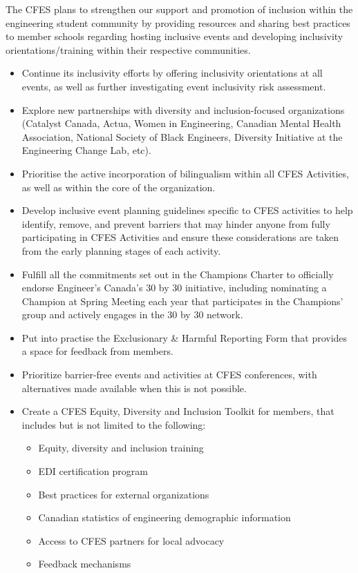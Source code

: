 
The CFES plans to strengthen our support and promotion of inclusion within the engineering student community by providing resources and sharing best practices to member schools regarding hosting inclusive events and developing inclusivity orientations/training within their respective communities.

\begin{itemize}
 \item Continue its inclusivity efforts by offering inclusivity orientations at all events, as well as further investigating event inclusivity risk assessment.
 \item Explore new partnerships with diversity and inclusion-focused organizations (Catalyst Canada, Actua, Women in Engineering, Canadian Mental Health Association, National Society of Black Engineers, Diversity Initiative at the Engineering Change Lab, etc).
 \item Prioritise the active incorporation of bilingualism within all CFES Activities, as well as within the core of the organization.
 \item Develop inclusive event planning guidelines specific to CFES activities to help identify, remove, and prevent barriers that may hinder anyone from fully participating in CFES Activities and ensure these considerations are taken from the early planning stages of each activity.
 \item Fulfill all the commitments set out in the Champions Charter to officially endorse Engineer's Canada's 30 by 30 initiative, including nominating a Champion at Spring Meeting each year that participates in the Champions' group and actively engages in the 30 by 30 network.
 \item Put into practise the Exclusionary \& Harmful Reporting Form that provides a space for feedback from members.
 \item Prioritize barrier-free events and activities at CFES conferences, with alternatives made available when this is not possible.
 \item Create a CFES Equity, Diversity and Inclusion Toolkit for members, that includes but is not limited to the following:
 \begin{itemize}
  \item Equity, diversity and inclusion training
  \item EDI certification program
  \item Best practices for external organizations
  \item Canadian statistics of engineering demographic information
  \item Access to CFES partners for local advocacy
  \item Feedback mechanisms
 \end{itemize}
\end{itemize}

\newpage
